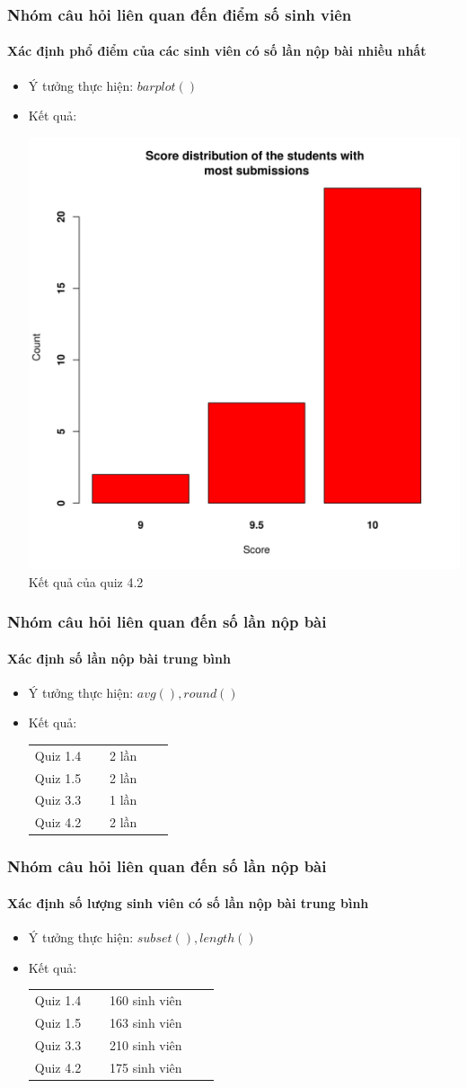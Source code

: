 \documentclass[english,10pt,table]{beamer}
\begin{document}
\frame
{
\frametitle{Nhóm câu hỏi liên quan đến điểm số sinh viên}
\framesubtitle{Xác định phổ điểm của các sinh viên có số lần nộp bài nhiều nhất}
\begin{itemize}
    \item Ý tưởng thực hiện: $barplot()$
    \item Kết quả:\\
    \begin{center}
        \includegraphics[width = 6 cm]{Images/img3-2-4.png}\\
        Kết quả của quiz 4.2
    \end{center}
\end{itemize}
}

\frame
{
\frametitle{Nhóm câu hỏi liên quan đến số lần nộp bài}
\framesubtitle{Xác định số lần nộp bài trung bình}
\begin{itemize}
    \item Ý tưởng thực hiện: $avg(), round()$
    \item Kết quả:\\
    \begin{center}
        \begin{tabular}{l l c c c}
             Quiz 1.4 & $\;$ & 2 lần\\
             Quiz 1.5 & $\;$ & 2 lần\\
             Quiz 3.3 & $\;$ & 1 lần\\
             Quiz 4.2 & $\;$ & 2 lần
        \end{tabular}
    \end{center}
\end{itemize}
}

\frame
{
\frametitle{Nhóm câu hỏi liên quan đến số lần nộp bài}
\framesubtitle{Xác định số lượng sinh viên có số lần nộp bài trung bình}
\begin{itemize}
    \item Ý tưởng thực hiện: $subset(), length()$
    \item Kết quả:\\
    \begin{center}
        \begin{tabular}{l l c c c}
             Quiz 1.4 & $\;$ & 160 sinh viên\\
             Quiz 1.5 & $\;$ & 163 sinh viên\\
             Quiz 3.3 & $\;$ & 210 sinh viên\\
             Quiz 4.2 & $\;$ & 175 sinh viên
        \end{tabular}
    \end{center}
\end{itemize}
}
\end{document}
